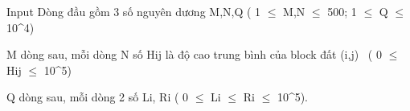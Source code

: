 Input
Dòng đầu gồm 3 số nguyên dương M,N,Q ( 1  $\le$  M,N  $\le$  500; 1  $\le$  Q  $\le$  10^4)

M dòng sau, mỗi dòng N số Hij là độ cao trung bình của block đất (i,j)  ( 0  $\le$  Hij $\le$  10^5)

Q dòng sau, mỗi dòng 2 số Li, Ri ( 0  $\le$  Li $\le$  Ri $\le$  10^5).

 